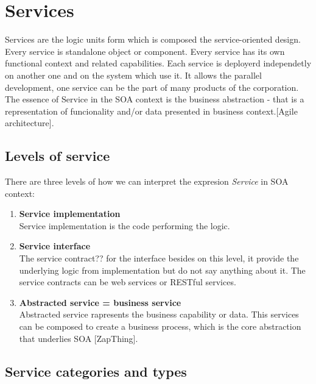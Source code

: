 \section{Services}
\label{sec:services}
Services are the logic units form which is composed the service-oriented design. Every service is standalone object or component. Every service has its own functional context and related capabilities. Each service is deployerd independetly on another one and on the system which use it. It allows the parallel development, one service can be the part of many products of the corporation.
The essence of Service in the SOA context is the business abstraction - that is a representation of funcionality and/or data presented in business context.[Agile architecture].

\subsection{Levels of service} 

There are three levels of how we can interpret the expresion \emph{Service} in SOA context:
\begin{enumerate}
  \item \textbf{Service implementation} \hfill \\
Service implementation is the code performing the logic.
  \item \textbf{Service interface} \hfill \\ 
The service contract?? for the interface besides on this level, it provide the underlying logic from implementation but do not say anything about it. The service contracts can be web services or RESTful services.
  \item \textbf{Abstracted service = business service} \hfill \\
Abstracted service rapresents the business capability or data. This services can be composed to create a business process, which is the core abstraction that underlies SOA [ZapThing].
\end{enumerate}



\subsection{Service categories and types} %

